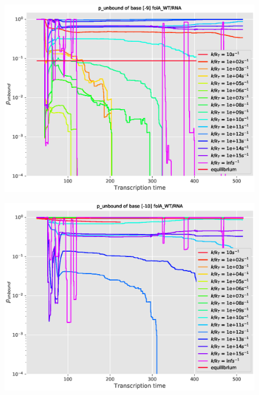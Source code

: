 \documentclass[11pt, a4paper]{article}
\begin{document}
\begin{figure}
\centering
\includegraphics[width=\linewidth]{p_unbound/RNA_p_unbound_base[-9]_k_tuning}
\caption{}
\label{fig:RNA_p_unbound_base[-9]_k_tuning}
\end{figure}
\begin{figure}
\centering
\includegraphics[width=\linewidth]{p_unbound/RNA_p_unbound_base[-10]_k_tuning}
\caption{}
\label{fig:RNA_p_unbound_base[-10]_k_tuning}
\end{figure}
\end{document}
